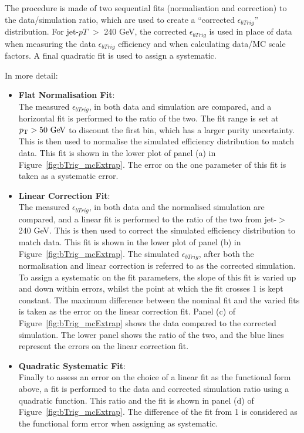 The procedure is made of two sequential fits (normalisation and correction) to the data/simulation ratio,
which are used to create a ``corrected  $\epsilon_{bTrig}$'' distribution.
For jet-$pT$ $>$ 240 GeV, the corrected $\epsilon_{bTrig}$ is used in place of data when measuring the data $\epsilon_{bTrig}$ efficiency
and when calculating data/MC scale factors.
A final quadratic fit is used to assign a systematic. 

\noindent
In more detail:
\begin{itemize}
  \setlength\itemsep{1em}
\item \textbf{Flat Normalisation Fit}: \\
  The measured $\epsilon_{bTrig}$, in both data and simulation are compared,
  and a horizontal fit is performed to the ratio of the two.
  The fit range is set at $\pT > 50\GeV$ to discount the first bin, which has a larger purity uncertainty.
  This is then used to normalise the simulated efficiency distribution to match data.
  This fit is shown in the lower plot  of panel (a) in Figure~\ref{fig:bTrig_mcExtrap}.
  The error on the one parameter of this fit is taken as a systematic error.
  
\item \textbf{Linear Correction Fit}:  \\
  The measured $\epsilon_{bTrig}$, in both data and the normalised simulation are compared,
  and a linear fit is performed to the ratio of the two from jet-\pT $>$ 240 GeV.
  This is then used to correct the simulated efficiency distribution to match data.
  This fit is shown in the lower plot of panel (b) in Figure~\ref{fig:bTrig_mcExtrap}.
  The simulated $\epsilon_{bTrig}$, after both the normalisation and linear correction is referred to as the corrected simulation.
  To assign a systematic on the fit parameters, the slope of this fit is varied up and down within errors,
  whilst the point at which the fit crosses 1 is kept constant.
  The maximum difference between the nominal fit and the varied fits is taken as the error on the linear correction fit.
  Panel (c) of Figure~\ref{fig:bTrig_mcExtrap} shows the data compared to the corrected simulation.
  The lower panel shows the ratio of the two, and the blue lines represent the errors on the linear correction fit.
  
\item \textbf{Quadratic Systematic Fit}: \\
  Finally to assess an error on the choice of a linear fit as the functional form above,
  a fit is performed to the data and corrected simulation ratio using a quadratic function.
  This ratio and the fit is shown in panel (d) of Figure~\ref{fig:bTrig_mcExtrap}.
  The difference of the fit from 1 is considered as the functional form error when assigning as systematic.
  
\end{itemize}

